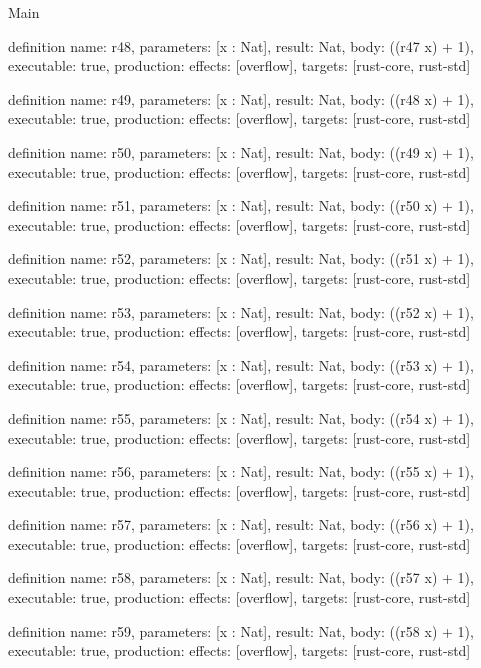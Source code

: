 \begin{lexlean}{Main}
\begin{semanticmodule}
definition{
  name: r48,
  parameters: [x : Nat],
  result: Nat,
  body: ((r47 x) + 1),
  executable: true,
  production: {effects: [overflow], targets: [rust-core, rust-std]}
}

definition{
  name: r49,
  parameters: [x : Nat],
  result: Nat,
  body: ((r48 x) + 1),
  executable: true,
  production: {effects: [overflow], targets: [rust-core, rust-std]}
}

definition{
  name: r50,
  parameters: [x : Nat],
  result: Nat,
  body: ((r49 x) + 1),
  executable: true,
  production: {effects: [overflow], targets: [rust-core, rust-std]}
}

definition{
  name: r51,
  parameters: [x : Nat],
  result: Nat,
  body: ((r50 x) + 1),
  executable: true,
  production: {effects: [overflow], targets: [rust-core, rust-std]}
}

definition{
  name: r52,
  parameters: [x : Nat],
  result: Nat,
  body: ((r51 x) + 1),
  executable: true,
  production: {effects: [overflow], targets: [rust-core, rust-std]}
}

definition{
  name: r53,
  parameters: [x : Nat],
  result: Nat,
  body: ((r52 x) + 1),
  executable: true,
  production: {effects: [overflow], targets: [rust-core, rust-std]}
}

definition{
  name: r54,
  parameters: [x : Nat],
  result: Nat,
  body: ((r53 x) + 1),
  executable: true,
  production: {effects: [overflow], targets: [rust-core, rust-std]}
}

definition{
  name: r55,
  parameters: [x : Nat],
  result: Nat,
  body: ((r54 x) + 1),
  executable: true,
  production: {effects: [overflow], targets: [rust-core, rust-std]}
}

definition{
  name: r56,
  parameters: [x : Nat],
  result: Nat,
  body: ((r55 x) + 1),
  executable: true,
  production: {effects: [overflow], targets: [rust-core, rust-std]}
}

definition{
  name: r57,
  parameters: [x : Nat],
  result: Nat,
  body: ((r56 x) + 1),
  executable: true,
  production: {effects: [overflow], targets: [rust-core, rust-std]}
}

definition{
  name: r58,
  parameters: [x : Nat],
  result: Nat,
  body: ((r57 x) + 1),
  executable: true,
  production: {effects: [overflow], targets: [rust-core, rust-std]}
}

definition{
  name: r59,
  parameters: [x : Nat],
  result: Nat,
  body: ((r58 x) + 1),
  executable: true,
  production: {effects: [overflow], targets: [rust-core, rust-std]}
}
\end{semanticmodule}
\end{lexlean}
